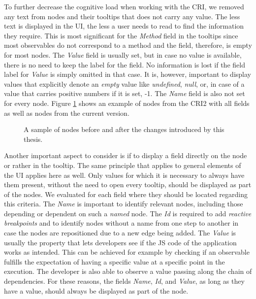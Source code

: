 To further decrease the cognitive load when working with the CRI, we removed any text from nodes and their tooltips that does not carry any value. The less text is displayed in the UI, the less a user needs to read to find the information they require. This is most significant for the \emph{Method} field in the tooltips since most observables do not correspond to a method and the field, therefore, is empty for most nodes. The \emph{Value} field is usually set, but in case no value is available, there is no need to keep the label for the field. No information is lost if the field label for \emph{Value} is simply omitted in that case.
It is, however, important to display values that explicitly denote an \emph{empty} value like \emph{undefined}, \emph{null}, or, in case of a value that carries positive numbers if it is set, -1. The \emph{Name} field is also not set for every node. Figure \ref{fig:Nodes} shows an example of nodes from the CRI2 with all fields as well as nodes from the current version.
\begin{figure}[!h]
	\centering
	\hfill
	\caption{A sample of nodes before and after the changes introduced by this thesis.}
	\label{fig:Nodes}
\end{figure}
Another important aspect to consider is if to display a field directly on the node or rather in the tooltip. The same principle that applies to general elements of the UI applies here as well. Only values for which it is necessary to always have them present, without the need to open every tooltip, should be displayed as part of the nodes. We evaluated for each field where they should be located regarding this criteria. The \emph{Name} is important to identify relevant nodes, including those depending or dependent on such a \emph{named} node. The \emph{Id} is required to add \emph{reactive breakpoints} and to identify nodes without a name from one step to another in case the nodes are repositioned due to a new edge being added. The \emph{Value} is usually the property that lets developers see if the JS code of the application works as intended. This can be achieved for example by checking if an observable fulfills the expectation of having a specific value at a specific point in the execution. The developer is also able to observe a value passing along the chain of dependencies. For these reasons, the fields \emph{Name}, \emph{Id}, and \emph{Value}, as long as they have a value, should always be displayed as part of the node.
